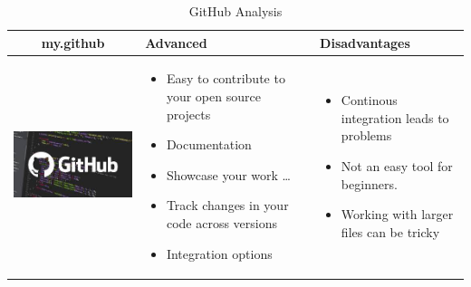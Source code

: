 \documentclass{article}
\begin{document}
\begin{table}[h!]
	\centering\begin{tabular}{| c | m{5cm} | m{5cm} | }
		\hline
		my.github & Advanced & Disadvantages \\ \hline
		\begin{minipage}{.4\textwidth}
			\includegraphics[width=\linewidth, height=40mm]{github}
			\end{minipage}
		&
		\begin{itemize}
			\item Easy to contribute to your open source projects
			\item Documentation
			\item Showcase your work \ldots
			\item Track changes in your code across versions
			\item Integration options
			\end{itemize}
		&
		\begin{itemize}
			\item Continous integration leads to problems
			\item Not an easy tool for beginners.
			\item Working with larger files can be tricky
			\end{itemize}
		\\ \hline
		\end{tabular}
	\caption{GitHub Analysis}\label{tbl:mygitHub}
	\end{table}
		
\end{document}
